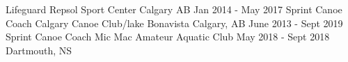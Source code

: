 \begin{cventries}
	\cventry
	{Lifeguard}
	{Repsol Sport Center}
	{Calgary AB}
	{Jan 2014 - May 2017}
	{}
	\cventry
	{Sprint Canoe Coach}
	{Calgary Canoe Club/lake Bonavista}
	{Calgary, AB}
	{June 2013 - Sept 2019}
	{}
	\cventry
	{Sprint Canoe Coach}
	{Mic Mac Amateur Aquatic Club}
	{May 2018 - Sept 2018}
	{Dartmouth, NS}
	{}
\end{cventries}
